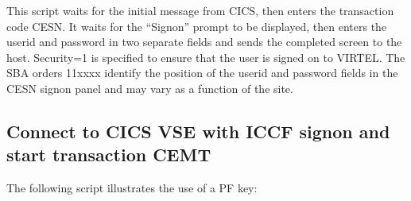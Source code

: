 \documentclass[letterpaper,10pt,english]{sphinxmanual}
\begin{document}
\sphinxAtStartPar
{}

\sphinxAtStartPar
This script waits for the initial message from CICS, then enters the transaction code CESN. It waits for the “Signon” prompt to be displayed, then enters the userid and password in two separate fields and sends the completed screen to the host. Security=1 is specified to ensure that the user is signed on to VIRTEL. The SBA orders 11xxxx identify the position of the userid and password fields in the CESN signon panel and may vary as a function of the site.

\ignorespaces 

\subsection{Connect to CICS VSE with ICCF sign\sphinxhyphen{}on and start transaction CEMT}
\label{\detokenize{connectivity_guide:connect-to-cics-vse-with-iccf-sign-on-and-start-transaction-cemt}}\label{\detokenize{connectivity_guide:index-128}}
\sphinxAtStartPar
The following script illustrates the use of a PF key:
\end{document}
